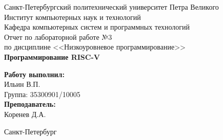 

    \begin{titlepage}

        \begin{center}

            \large Санкт-Петербургский политехнический университет Петра Великого\\
            \large Институт компьютерных наук и технологий \\
            \large Кафедра компьютерных систем и программных технологий\\[6cm]

            \huge Отчет по лабораторной работе №3\\[0.5cm]
            \large по дисциплине <<Низкоуровневое программирование>>\\[0.1cm]
            \large\textbf{Программирование RISC-V}\\[5cm]

        \end{center}


        \begin{flushright}
            \begin{minipage}{0.25\textwidth}
                \begin{flushleft}

                    \large\textbf{Работу выполнил:}\\
                    \large Ильин В.П.\\
                    \large {Группа:} 35300901/10005\\

                    \large \textbf{Преподаватель:}\\
                    \large Коренев Д.А.

                \end{flushleft}
            \end{minipage}
        \end{flushright}

        \vfill

        \begin{center}
            \large Санкт-Петербург\\
            \large \the\year
        \end{center}

    \end{titlepage}
    \vfill
    \newpage
    \renewcommand\contentsname{\centerline{Содержание}}
    \tableofcontents
    \newpage
    \pagestyle{fancy}
    \setlength{\headheight}{14.5pt}
    \renewcommand{\sectionmark}[1]{\markright{#1}}

